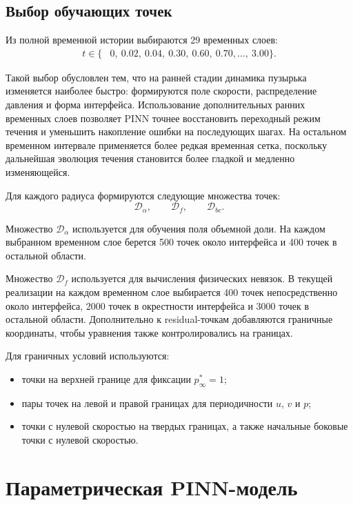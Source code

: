 \documentclass[12pt,a4paper]{article}
\begin{document}
\subsection{Выбор обучающих точек}

Из полной временной истории выбираются 29 временных слоев:
\[
\begin{split}
    t\in\{&
    0,\ 0.02,\ 0.04,\ 0.30,\ 0.60,\ 0.70,\ldots,\ 3.00
    \}.
\end{split}
\]

Такой выбор обусловлен тем, что на ранней стадии динамика пузырька изменяется наиболее быстро: формируются поле скорости, распределение давления и форма интерфейса. Использование дополнительных ранних временных слоев позволяет PINN точнее восстановить переходный режим течения и уменьшить накопление ошибки на последующих шагах. На остальном временном интервале применяется более редкая временная сетка, поскольку дальнейшая эволюция течения становится более гладкой и медленно изменяющейся.

Для каждого радиуса формируются следующие множества точек:
\[
    \mathcal{D}_\alpha,\qquad
    \mathcal{D}_f,\qquad
    \mathcal{D}_{bc}.
\]

Множество \(\mathcal{D}_\alpha\) используется для обучения поля объемной доли.
На каждом выбранном временном слое берется 500 точек около интерфейса и
400 точек в остальной области. 

Множество \(\mathcal{D}_f\) используется для вычисления физических невязок.
В текущей реализации на каждом временном слое выбирается 400 точек
непосредственно около интерфейса, 2000 точек в окрестности интерфейса и
3000 точек в остальной области. Дополнительно к residual-точкам добавляются
граничные координаты, чтобы уравнения также контролировались на границах.

Для граничных условий используются:
\begin{itemize}
    \item точки на верхней границе для фиксации \(p_\infty^*=1\);
    \item пары точек на левой и правой границах для периодичности \(u\), \(v\)
    и \(p\);
    \item точки с нулевой скоростью на твердых границах, а также начальные
    боковые точки с нулевой скоростью.
\end{itemize}

\section{Параметрическая PINN-модель}
\end{document}
